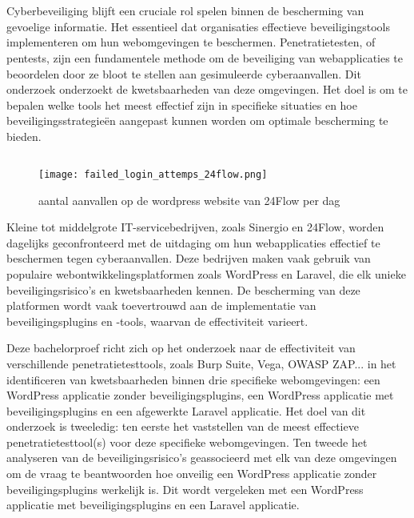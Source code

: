 
\chapter{}%
\label{ch:inleiding}
Cyberbeveiliging blijft een cruciale rol spelen binnen de bescherming van gevoelige informatie. Het essentieel dat organisaties 
effectieve beveiligingstools implementeren om hun webomgevingen te beschermen. Penetratietesten, of pentests, zijn een 
fundamentele methode om de beveiliging van webapplicaties te beoordelen door ze bloot te stellen aan gesimuleerde 
cyberaanvallen. Dit onderzoek onderzoekt de kwetsbaarheden van deze omgevingen. Het doel is om te bepalen welke tools 
het meest effectief zijn in specifieke situaties en hoe beveiligingsstrategieën aangepast kunnen worden om optimale 
bescherming te bieden.



\section{}%
\label{sec:probleemstelling}

\begin{figure}
  \centering
  \texttt{[image: failed\_login\_attemps\_24flow.png]}
  \caption[aantal aanvallen op de wordpress website van 24Flow per dag ]{aantal aanvallen op de wordpress website van 24Flow per dag }
\end{figure}
Kleine tot middelgrote IT-servicebedrijven, zoals Sinergio en 24Flow, worden dagelijks geconfronteerd met de uitdaging om hun 
webapplicaties effectief te beschermen tegen cyberaanvallen. Deze bedrijven maken vaak gebruik van populaire webontwikkelingsplatformen 
zoals WordPress en Laravel, die elk unieke beveiligingsrisico's en kwetsbaarheden kennen. De bescherming van deze platformen 
wordt vaak toevertrouwd aan de implementatie van beveiligingsplugins en -tools, waarvan de effectiviteit varieert.

Deze bachelorproef richt zich op het onderzoek naar de effectiviteit van verschillende penetratietesttools, zoals Burp Suite, Vega, OWASP ZAP... 
in het identificeren van kwetsbaarheden binnen drie specifieke webomgevingen: een WordPress applicatie zonder beveiligingsplugins,
een WordPress applicatie met beveiligingsplugins en een afgewerkte Laravel applicatie. Het doel van dit onderzoek is tweeledig: 
ten eerste het vaststellen van de meest effectieve penetratietesttool(s) voor deze specifieke webomgevingen. Ten tweede het 
analyseren van de beveiligingsrisico's geassocieerd met elk van deze omgevingen om de vraag te beantwoorden hoe onveilig een 
WordPress applicatie zonder beveiligingsplugins werkelijk is. Dit wordt vergeleken met een WordPress applicatie met 
beveiligingsplugins en een Laravel applicatie.

